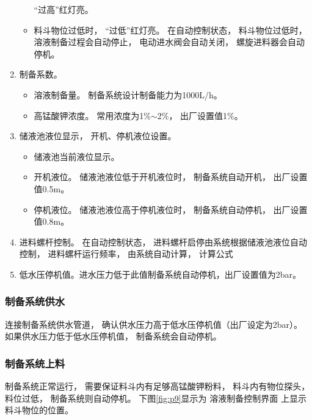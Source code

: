 \documentclass[UTF8,a4paper,12pt,titlepage]{ctexart}
\begin{document}
\begin{enumerate}
\begin{itemize}
                    “过高”红灯亮。
                \item 料斗物位过低时，
                    “过低”红灯亮。
                    在自动控制状态，
                    料斗物位过低时，
                    溶液制备过程会自动停止，
                    电动进水阀会自动关闭，
                    螺旋进料器会自动停机。
            \end{itemize}
         \item 制备系数。
            \begin{itemize}
               \item 溶液制备量。
               制备系统设计制备能力为1000L/h。
               \item 高锰酸钾浓度。
               常用浓度为1\%$\sim$2\%，
               出厂设置值1\%。
            \end{itemize}
         \item 储液池液位显示，
            开机、停机液位设置。
            \begin{itemize}
               \item 储液池当前液位显示。
               \item 开机液位。
                  储液池液位低于开机液位时，
                  制备系统自动开机，
                  出厂设置值0.5m。
               \item 停机液位。
                  储液池液位高于停机液位时，
                  制备系统自动停机，
                  出厂设置值0.8m。
            \end{itemize}
         \item 进料螺杆控制。
            在自动控制状态，
            进料螺杆启停由系统根据储液池液位自动控制，
            进料螺杆运行频率，
            由系统自动计算，
            计算公式
         \item 低水压停机值。进水压力低于此值制备系统自动停机，出厂设置值为2bar。
      \end{enumerate}

      \subsubsection{制备系统供水}\label{sec:sg4}
         连接制备系统供水管道，
         确认供水压力高于低水压停机值（出厂设定为2bar）。
         如果供水压力低于低水压停机值，
         制备系统会自动停机。

      \subsubsection{制备系统上料}
         制备系统正常运行，
         需要保证料斗内有足够高锰酸钾粉料，
         料斗内有物位探头，
         料位过低，
         制备系统则自动停机。
         下图\ref{fig:p9}显示为
         溶液制备控制界面
         上显示料斗物位的位置。
\end{document}
